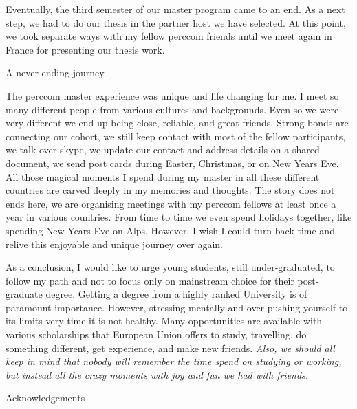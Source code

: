 \documentclass[10pt,a4paper]{article} %
\newcommand{\NewsItem}[1]{ %
\usefont{T1}{fvs}{n}{n} %
\vspace{24pt}\large #1\vspace{3pt} %
\par \normalsize \normalfont}
\begin{document}
\begin{multicols}{3}
Eventually, the third semester of our master program came to an end. 
As a next step, we had to do our thesis in the partner host we have selected. 
At this point, we took separate ways with my fellow {\sc perccom} friends 
until we meet again in France for presenting our thesis work. 




\NewsItem{A never ending journey}

The {\sc perccom} master experience was unique and life changing for me. 
I meet so many different people from various cultures and backgrounds. 
Even so we were very different we end up being close, reliable, and great friends.
Strong bonds are connecting our cohort, we still keep contact with most of the 
fellow participants, we talk over skype, we update our contact and address details 
on a shared document, we send post cards during Easter, Christmas, 
or on New Years Eve.
All those magical moments I spend during my master in all these different countries 
are carved deeply in my memories and thoughts. 
The story does not ends here, we are organising meetings with my {\sc perccom} 
fellows at least once a year in various countries. 
From time to time we even spend holidays together, like spending New Years Eve on 
Alps. 
However, I wish I could turn back time and relive this enjoyable and 
unique journey over again. 


As a conclusion, I would like to urge young students, still under-graduated, to 
follow my path and not to focus only on mainstream choice for their post-graduate 
degree. 
Getting a degree from a highly ranked University is of paramount importance. 
However, stressing mentally and over-pushing yourself to its limits very time 
it is not healthy. 
Many opportunities are available with various scholarships that European Union 
offers to study, travelling, do something different, get experience, and make 
new friends.
\textit{Also, we should all keep in mind that nobody will remember the time spend on studying 
or working, but instead all the crazy moments with joy and fun we had with friends.}

 
 
\NewsItem{Acknowledgements}


\end{multicols}
\end{document}
